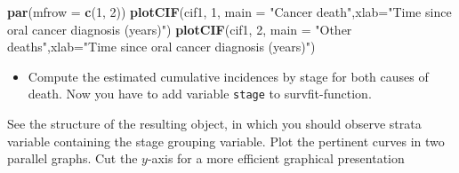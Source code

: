 \documentclass[
]{book}
\newenvironment{Shaded}{\begin{snugshade}}{\end{snugshade}}
\newcommand{\AttributeTok}[1]{\textcolor[rgb]{0.13,0.29,0.53}{#1}}
\newcommand{\DecValTok}[1]{\textcolor[rgb]{0.00,0.00,0.81}{#1}}
\newcommand{\FloatTok}[1]{\textcolor[rgb]{0.00,0.00,0.81}{#1}}
\newcommand{\FunctionTok}[1]{\textcolor[rgb]{0.13,0.29,0.53}{\textbf{#1}}}
\newcommand{\NormalTok}[1]{#1}
\newcommand{\OtherTok}[1]{\textcolor[rgb]{0.56,0.35,0.01}{#1}}
\newcommand{\SpecialCharTok}[1]{\textcolor[rgb]{0.81,0.36,0.00}{\textbf{#1}}}
\newcommand{\StringTok}[1]{\textcolor[rgb]{0.31,0.60,0.02}{#1}}
\providecommand{\tightlist}{%
  \setlength{\itemsep}{0pt}\setlength{\parskip}{0pt}}
\begin{document}
\begin{Shaded}
\begin{Highlighting}[]
\FunctionTok{par}\NormalTok{(}\AttributeTok{mfrow =} \FunctionTok{c}\NormalTok{(}\DecValTok{1}\NormalTok{, }\DecValTok{2}\NormalTok{))}
\FunctionTok{plotCIF}\NormalTok{(cif1, }\DecValTok{1}\NormalTok{, }\AttributeTok{main =} \StringTok{"Cancer death"}\NormalTok{,}\AttributeTok{xlab=}\StringTok{"Time since oral cancer diagnosis (years)"}\NormalTok{)}
\FunctionTok{plotCIF}\NormalTok{(cif1, }\DecValTok{2}\NormalTok{, }\AttributeTok{main =} \StringTok{"Other deaths"}\NormalTok{,}\AttributeTok{xlab=}\StringTok{"Time since oral cancer diagnosis (years)"}\NormalTok{)}
\end{Highlighting}
\end{Shaded}

\begin{itemize}
\tightlist
\item
  Compute the estimated
  cumulative incidences by stage for both causes of death.
  Now you have to add variable \texttt{stage} to survfit-function.
\end{itemize}

See the structure of the resulting object, in which you should
observe strata variable containing the stage grouping variable. Plot the pertinent curves in two parallel graphs.
Cut the \(y\)-axis for a more efficient graphical presentation

\begin{Shaded}
\end{Shaded}
\end{document}
